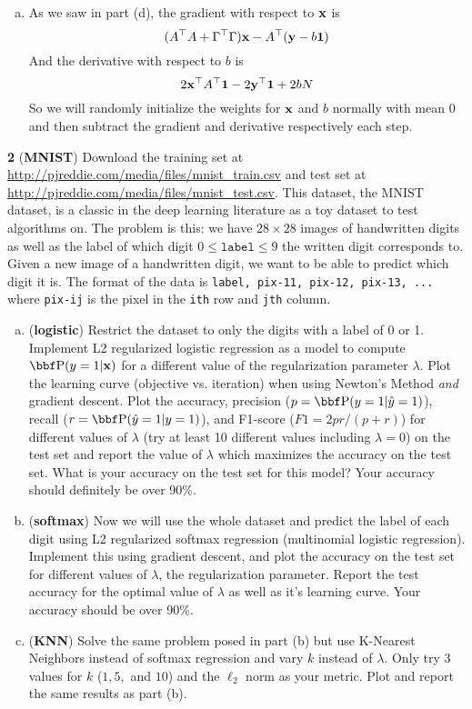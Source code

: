 \documentclass[12pt,letterpaper,fleqn]{hmcpset}
\begin{document}
\begin{enumerate}[(a)]
    \item
        As we saw in part (d), the gradient with respect to ${\bf x}$ is
            $$ (A^\top A + \Gamma^\top \Gamma){\bf x} - A^\top ({\bf y}  - b{\bf 1})$$
        And the derivative with respect to $b$ is 
            $$2 {\bf x}^\top A^\top{\bf 1} -2{\bf y}^\top{\bf 1} +2 b N$$
        So we will randomly initialize the weights for ${\bf x}$ and $b$ normally with mean $0$ and then subtract the gradient and derivative respectively each step.


\end{enumerate}


\newpage

\textbf{2} (\textbf{MNIST}) Download the training set at 
\url{http://pjreddie.com/media/files/mnist_train.csv} and test set at
\url{http://pjreddie.com/media/files/mnist_test.csv}. This dataset, the MNIST
dataset, is a classic in the deep learning literature as a toy dataset to test
algorithms on. The problem is this: we have $28\times 28$ images of handwritten
digits as well as the label of which digit $0 \leq \texttt{label} \leq 9$ the written
digit corresponds to. Given a new image of a handwritten digit, we want to be
able to predict which digit it is.
The format of the data is \texttt{label, pix-11, pix-12, pix-13, ...}
where \texttt{pix-ij} is the pixel in the \texttt{ith} row and \texttt{jth} column.
\begin{enumerate}[(a)]
    \item (\textbf{logistic}) Restrict the dataset to only the digits with a label
        of 0 or 1. Implement L2 regularized logistic regression as a model to compute
        $\PP(y=1|\xx)$ for a different value of the regularization parameter $\lambda$.
        Plot the learning curve (objective vs. iteration) when using Newton's Method
        \textit{and} gradient descent.
        Plot the accuracy, precision ($p = \PP(y=1 | \hat y=1)$), recall ($r = \PP(\hat y=1 | y=1)$),
        and F1-score ($F1 = 2pr / (p+r)$) for different values of $\lambda$ (try at least
        10 different values including $\lambda = 0$) on the test set and report the
        value of $\lambda$ which maximizes the accuracy on the test set. What is your
        accuracy on the test set for this model? Your accuracy should definitely be
        over 90\%.

    \item (\textbf{softmax}) Now we will use the whole dataset and predict the label
        of each digit using L2 regularized softmax regression (multinomial logistic
        regression). Implement this using gradient descent, and plot the accuracy
        on the test set for different values of $\lambda$, the regularization parameter.
        Report the test accuracy for the optimal value of $\lambda$ as well as it's
        learning curve. Your accuracy should be over 90\%.

    \item (\textbf{KNN}) Solve the same problem posed in part (b) but use
        K-Nearest Neighbors instead of softmax regression and vary $k$ instead
        of $\lambda$. Only try 3 values for $k$ ($1,5,$ and $10$) and the $\ell_2$
        norm as your metric. Plot and report the same results as part (b).
\end{enumerate}
\end{document}
